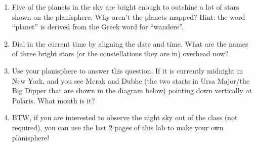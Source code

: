 \documentclass[10pt]{article}%
\begin{document}
\begin{enumerate}


\item Five of the planets in the sky are bright enough to outshine a lot of stars shown on the planisphere. Why aren’t the planets mapped? Hint: the word ``planet'' is derived from the Greek word for ``wandere''.

\item Dial in the current time by aligning the date and time. What are the names of three bright stars (or the constellations they are in) overhead now?

\item Use your planisphere to answer this question. If it is currently midnight in New York, and you see Merak and Dubhe (the two starts in Ursa Major/the Big Dipper that are shown in the diagram below) pointing down vertically at Polaris. What month is it?

\item BTW, if you are interested to observe the night sky out of the class (not required), you can use the last 2 pages of this lab to make your own planisphere!
\end{enumerate}
\end{document}
